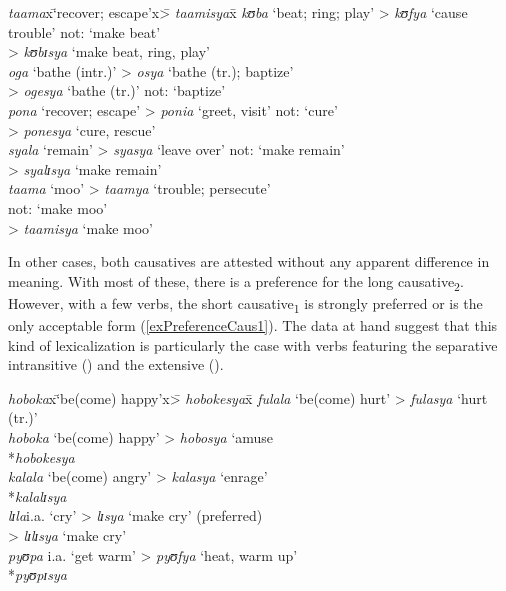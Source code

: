 \begin{exe}
\ex \label{exShortCausativeLexicalized}
\begin{tabbing}
\textit{taama}x\=\lq recover; escape'x\= > \textit{taamisya}x\=\kill %
\textit{kʊba} \> \lq beat; ring; play' \> > \textit{kʊfya} \> \lq cause trouble' not: \lq make beat'\\
\> \> > \textit{kʊbɪsya} \> \lq make beat, ring, play'\\
\textit{oga} \> \lq bathe (intr.)' \> > \textit{osya} \> \lq bathe (tr.); baptize'\\
\> \> > \textit{ogesya} \> \lq bathe (tr.)' not: \lq baptize'\\
\textit{pona} \> \lq recover; escape' \> > \textit{ponia} \> \lq greet, visit' not: \lq cure'\\
\> \> > \textit{ponesya} \> \lq cure, rescue'\\
\textit{syala} \> \lq remain' \> > \textit{syasya} \> \lq leave over' not: \lq make remain'\\
\> \> > \textit{syalɪsya} \> \lq make remain'\\
\textit{taama} \> \lq moo' \> > \textit{taamya} \> \lq trouble; persecute'\\
\>\>\>not: \lq make moo'\\
\> \> > \textit{taamisya} \> \lq make moo'
\end{tabbing}
\end{exe}

In other cases, both causatives are attested without any apparent difference in meaning. With most of these, there is a preference for the long causative\textsubscript{2}. However, with a few verbs, the short causative\textsubscript{1} is strongly preferred or is the only acceptable form (\ref{exPreferenceCaus1}). The data at hand suggest that this kind of lexicalization is particularly the case with verbs featuring the separative intransitive () and the extensive ().

\begin{exe}
\ex \label{exPreferenceCaus1}\begin{tabbing}
\textit{hoboka}x\=\lq be(come) happy'x\= > \textit{hobokesya}x\=\kill %
\textit{fulala}\> \lq be(come) hurt'\> > \textit{fulasya} \> \lq hurt (tr.)'\\
\textit{hoboka}\> \lq be(come) happy'\> > \textit{hobosya} \> \lq amuse\\
\> \> \hphantom{> }*\textit{hobokesya}\\
\textit{kalala}\> `be(come) angry' \> > \textit{kalasya} \> \lq enrage'\\
\> \> \> *\textit{kalalɪsya}\\
\textit{lɪla}\>i.a. \lq cry' \> > \textit{lɪsya} \> \lq make cry' (preferred)\\
\> \> > \textit{lɪlɪsya} \> \lq make cry'\\
\textit{pyʊpa}\> i.a. \lq get warm' \> > \textit{pyʊfya} \> \lq heat, warm up'\\
\> \> \hphantom{> }*\textit{pyʊpɪsya}
\end{tabbing} 
\end{exe}

